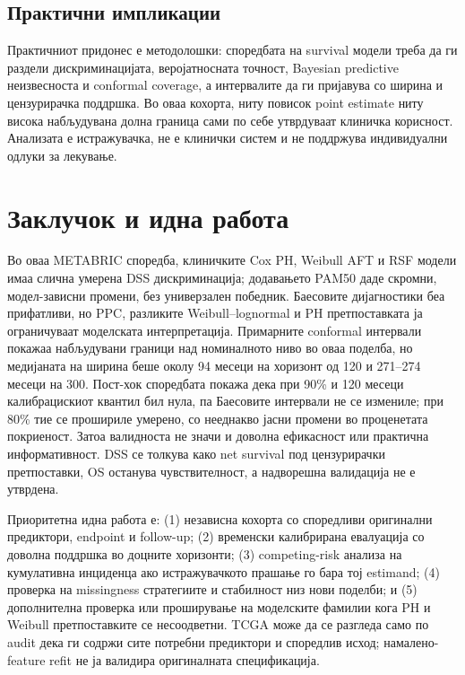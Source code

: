 \documentclass[12pt]{article}
\begin{document}
\subsection{Практични импликации}

Практичниот придонес е методолошки: споредбата на survival модели треба да ги
раздели дискриминацијата, веројатносната точност, Bayesian predictive
неизвесноста и conformal coverage, а интервалите да ги пријавува со ширина и
цензурирачка поддршка. Во оваа кохорта, ниту повисок point estimate ниту висока
набљудувана долна граница сами по себе утврдуваат клиничка корисност. Анализата
е истражувачка, не е клинички систем и не поддржува индивидуални одлуки за
лекување.

\section{Заклучок и идна работа}

Во оваа METABRIC споредба, клиничките Cox PH, Weibull AFT и RSF модели имаа
слична умерена DSS дискриминација; додавањето PAM50 даде скромни, модел-зависни
промени, без универзален победник. Баесовите дијагностики беа прифатливи, но
PPC, разликите Weibull--lognormal и PH претпоставката ја ограничуваат
моделската интерпретација. Примарните conformal интервали покажаа набљудувани
граници над номиналното ниво во оваа поделба, но медијаната на ширина беше околу
94 месеци на хоризонт од 120 и 271--274 месеци на 300. Пост-хок споредбата
покажа дека при 90\% и 120 месеци калибрацискиот квантил бил нула, па Баесовите
интервали не се измениле; при 80\% тие се прошириле умерено, со нееднакво јасни
промени во проценетата покриеност. Затоа валидноста не значи и доволна
ефикасност или практична информативност. DSS се толкува како net
survival под цензурирачки претпоставки, OS останува чувствителност, а надворешна
валидација не е утврдена.

Приоритетна идна работа е: (1) независна кохорта со споредливи оригинални
предиктори, endpoint и follow-up; (2) временски калибрирана евалуација со
доволна поддршка во доцните хоризонти; (3) competing-risk анализа на кумулативна
инциденца ако истражувачкото прашање го бара тој estimand; (4) проверка на
missingness стратегиите и стабилност низ нови поделби; и (5) дополнителна
проверка или проширување на моделските фамилии кога PH и Weibull претпоставките
се несоодветни. TCGA може да се разгледа само по audit дека ги содржи сите
потребни предиктори и споредлив исход; намалено-feature refit не ја валидира
оригиналната спецификација.
\end{document}
